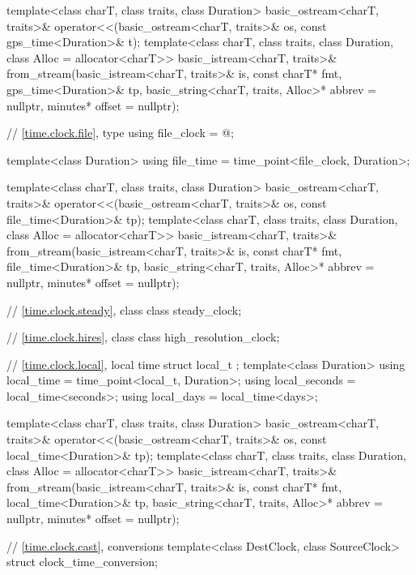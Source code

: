 \begin{codeblock}
{  template<class charT, class traits, class Duration>
    basic_ostream<charT, traits>&
      operator<<(basic_ostream<charT, traits>& os, const gps_time<Duration>& t);
  template<class charT, class traits, class Duration, class Alloc = allocator<charT>>
    basic_istream<charT, traits>&
      from_stream(basic_istream<charT, traits>& is, const charT* fmt,
                  gps_time<Duration>& tp,
                  basic_string<charT, traits, Alloc>* abbrev = nullptr,
                  minutes* offset = nullptr);

  // \ref{time.clock.file}, type 
  using file_clock = @\seebelow@;

  template<class Duration>
    using file_time = time_point<file_clock, Duration>;

  template<class charT, class traits, class Duration>
    basic_ostream<charT, traits>&
      operator<<(basic_ostream<charT, traits>& os, const file_time<Duration>& tp);
  template<class charT, class traits, class Duration, class Alloc = allocator<charT>>
    basic_istream<charT, traits>&
      from_stream(basic_istream<charT, traits>& is, const charT* fmt,
                  file_time<Duration>& tp,
                  basic_string<charT, traits, Alloc>* abbrev = nullptr,
                  minutes* offset = nullptr);

  // \ref{time.clock.steady}, class 
  class steady_clock;

  // \ref{time.clock.hires}, class 
  class high_resolution_clock;

  // \ref{time.clock.local}, local time
  struct local_t {};
  template<class Duration>
    using local_time  = time_point<local_t, Duration>;
  using local_seconds = local_time<seconds>;
  using local_days    = local_time<days>;

  template<class charT, class traits, class Duration>
    basic_ostream<charT, traits>&
      operator<<(basic_ostream<charT, traits>& os, const local_time<Duration>& tp);
  template<class charT, class traits, class Duration, class Alloc = allocator<charT>>
    basic_istream<charT, traits>&
      from_stream(basic_istream<charT, traits>& is, const charT* fmt,
                  local_time<Duration>& tp,
                  basic_string<charT, traits, Alloc>* abbrev = nullptr,
                  minutes* offset = nullptr);

  // \ref{time.clock.cast},  conversions
  template<class DestClock, class SourceClock>
    struct clock_time_conversion;

}
\end{codeblock}
